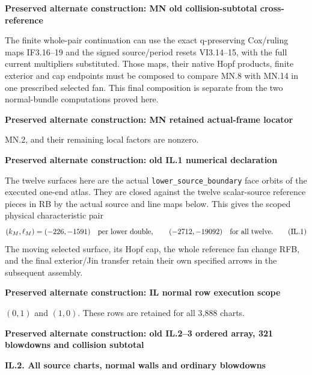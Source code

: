 \par



\par\bigskip\noindent\textbf{Preserved alternate construction: MN old collision-subtotal cross-reference}\par
The finite whole-pair continuation can use the exact q-preserving
Cox/ruling maps IF3.16--19 and the signed source/period resets
VI3.14--15, with the full current multipliers substituted. Those
maps, their native Hopf products, finite exterior and cap endpoints
must be composed to compare MN.8 with MN.14 in one prescribed
selected fan. This final composition is separate from the two
normal-bundle computations proved here.




\par\bigskip\noindent\textbf{Preserved alternate construction: MN retained actual-frame locator}\par
MN.2, and their remaining local factors are nonzero.

\par\bigskip\noindent\textbf{Preserved alternate construction: old IL.1 numerical declaration}\par
The twelve surfaces here are the actual \texttt{lower\_source\_boundary} face
orbits of the executed one-end atlas. They are closed against the
twelve scalar-source reference pieces in RB by the actual source and
line maps below. This gives the scoped physical characteristic pair
\[
 (k_M,\ell_M)=(-226,-1591)\quad\hbox{per lower double},\qquad
             (-2712,-19092)\quad\hbox{for all twelve}.
 \tag{IL.1}
\]
The moving selected surface, its Hopf cap, the whole reference fan
change RFB, and the final exterior/Jin transfer retain their own
specified arrows in the subsequent assembly.



\par\bigskip\noindent\textbf{Preserved alternate construction: IL normal row execution scope}\par
\((0,1)\) and \((1,0)\). These rows are retained for all 3,888 charts.

\par\bigskip\noindent\textbf{Preserved alternate construction: old IL.2--3 ordered array, 321 blowdowns and collision subtotal}\par
\medskip\noindent\textbf{IL.2. All source charts, normal walls and ordinary blowdowns}

\par\nobreak

